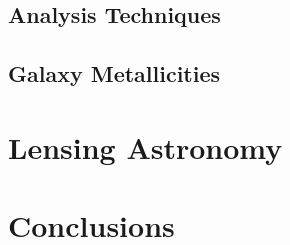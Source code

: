 \documentclass[fleqn,usenatbib]{mnras}
\begin{document}
\subsection{Analysis Techniques}
\subsection{Galaxy Metallicities}

\section{Lensing Astronomy}
\label{sec:lens}

\section{Conclusions}
\label{sec:conc}














\appendix




\bsp	%
\label{lastpage}
\end{document}
